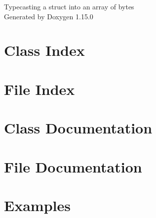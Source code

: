 \documentclass[twoside]{book}
\newcommand{\+}{\discretionary{\mbox{\scriptsize$\hookleftarrow$}}{}{}}
\newcommand{\clearemptydoublepage}{%
    \newpage{\pagestyle{empty}\cleardoublepage}%
  }
\begin{document}
  \raggedbottom
    \hypersetup{pageanchor=false,
                bookmarksnumbered=true,
                pdfencoding=unicode
               }
  \begin{titlepage}
  \vspace*{7cm}
  \begin{center}%
  {\Large Typecasting a struct into an array of bytes}\\
  \vspace*{1cm}
  {\large Generated by Doxygen 1.15.0}\\
  \end{center}
  \end{titlepage}
  \clearemptydoublepage
  \tableofcontents
  \clearemptydoublepage
  \hypersetup{pageanchor=true}
\chapter{Class Index}

\chapter{File Index}

\chapter{Class Documentation}

\chapter{File Documentation}



\chapter{Examples}

  \backmatter
  \newpage
  \clearemptydoublepage
  \printindex
\end{document}
